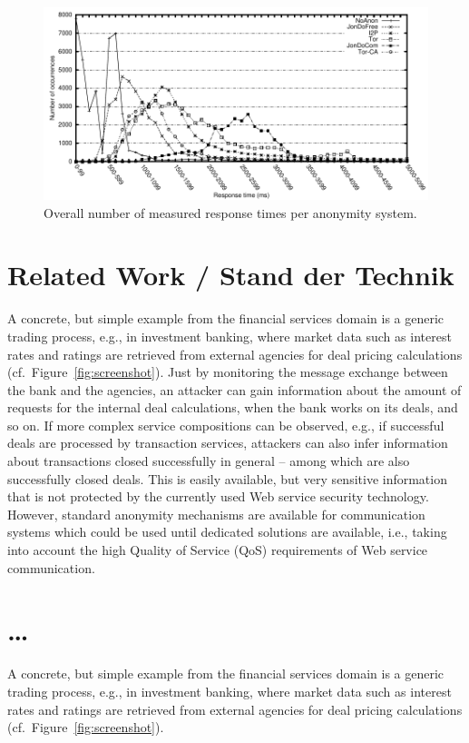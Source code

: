 \begin{figure}[t]
	\centering
	\includegraphics[width=\textwidth]{gfx/histo_allcurves} %
	\caption{Overall number of measured response times per anonymity system.}\label{fig:histoall}
\end{figure}


\section{Related Work / Stand der Technik}
A concrete, but simple example from the financial services domain is a generic trading process, e.g., in investment banking, where market data such as interest rates and ratings are retrieved from external agencies for deal pricing calculations (cf.~Figure~\ref{fig:screenshot}). Just by monitoring the message exchange between the bank and the agencies, an attacker can gain information about the amount of requests for the internal deal calculations, when the bank works on its deals, and so on. If more complex service compositions can be observed, e.g., if successful deals are processed by transaction services, attackers can also infer information about transactions closed successfully in general -- among which are also successfully closed deals. This is easily available, but very sensitive information that is not protected by the currently used Web service security technology. However, standard anonymity mechanisms are available for communication systems which could be used until dedicated solutions are available, i.e., taking into account the high Quality of Service (QoS) requirements of Web service communication. 


\section{\dots}
A concrete, but simple example from the financial services domain is a generic trading process, e.g., in investment banking, where market data such as interest rates and ratings are retrieved from external agencies for deal pricing calculations (cf.~Figure~\ref{fig:screenshot}). 


